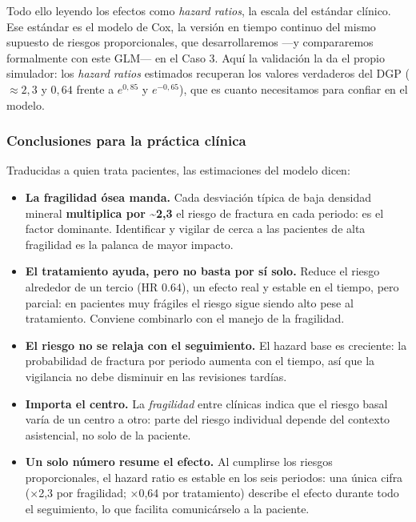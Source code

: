 \documentclass[
  letterpaper,
  DIV=11,
  numbers=noendperiod]{scrartcl}
\providecommand{\tightlist}{%
  \setlength{\itemsep}{0pt}\setlength{\parskip}{0pt}}\usepackage{longtable,booktabs,array}
\begin{document}
Todo ello leyendo los efectos como \emph{hazard ratios}, la escala del
estándar clínico. Ese estándar es el modelo de Cox, la versión en tiempo
continuo del mismo supuesto de riesgos proporcionales, que
desarrollaremos ---y compararemos formalmente con este GLM--- en el Caso
3. Aquí la validación la da el propio simulador: los \emph{hazard
ratios} estimados recuperan los valores verdaderos del DGP
(\(\approx 2{,}3\) y \(0{,}64\) frente a \(e^{0{,}85}\) y
\(e^{-0{,}65}\)), que es cuanto necesitamos para confiar en el modelo.

\hypertarget{sec-u15-clinica}{%
\subsubsection{Conclusiones para la práctica
clínica}\label{sec-u15-clinica}}

Traducidas a quien trata pacientes, las estimaciones del modelo dicen:

\begin{itemize}
\tightlist
\item
  \textbf{La fragilidad ósea manda.} Cada desviación típica de baja
  densidad mineral \textbf{multiplica por \textasciitilde2,3} el riesgo
  de fractura en cada periodo: es el factor dominante. Identificar y
  vigilar de cerca a las pacientes de alta fragilidad es la palanca de
  mayor impacto.
\item
  \textbf{El tratamiento ayuda, pero no basta por sí solo.} Reduce el
  riesgo alrededor de un tercio (HR \(0.64\)), un efecto real y estable
  en el tiempo, pero parcial: en pacientes muy frágiles el riesgo sigue
  siendo alto pese al tratamiento. Conviene combinarlo con el manejo de
  la fragilidad.
\item
  \textbf{El riesgo no se relaja con el seguimiento.} El hazard base es
  creciente: la probabilidad de fractura por periodo aumenta con el
  tiempo, así que la vigilancia no debe disminuir en las revisiones
  tardías.
\item
  \textbf{Importa el centro.} La \emph{fragilidad} entre clínicas indica
  que el riesgo basal varía de un centro a otro: parte del riesgo
  individual depende del contexto asistencial, no solo de la paciente.
\item
  \textbf{Un solo número resume el efecto.} Al cumplirse los riesgos
  proporcionales, el hazard ratio es estable en los seis periodos: una
  única cifra (×2,3 por fragilidad; ×0,64 por tratamiento) describe el
  efecto durante todo el seguimiento, lo que facilita comunicárselo a la
  paciente.
\end{itemize}
\end{document}
